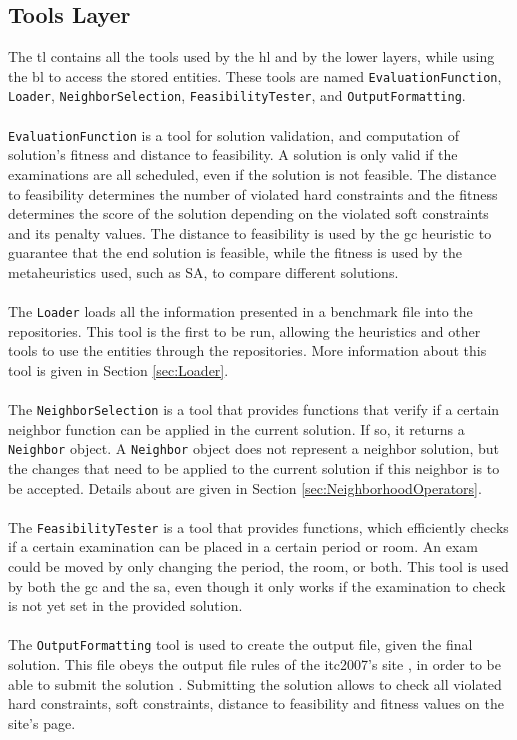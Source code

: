 \subsection{Tools Layer}
\label{subsec:ToolsLayer}
The \gls{tl} contains all the tools used by the \gls{hl} and by the lower layers, while using the \gls{bl} to access the stored entities. These tools are named \verb+EvaluationFunction+, \verb+Loader+, \verb+NeighborSelection+, \verb+FeasibilityTester+, and \verb+OutputFormatting+.\\
\\
\verb+EvaluationFunction+ is a tool  for solution validation, and computation of solution's fitness and distance to feasibility. A solution is only valid if the examinations are all scheduled, even if the solution is not feasible. The distance to feasibility determines the number of violated hard constraints and the fitness determines the score of the solution depending on the violated soft constraints and its penalty values. The distance to feasibility is used by the \gls{gc} heuristic to guarantee that the end solution is feasible, while the fitness is used by the metaheuristics used, such as SA, to compare different solutions.\\
\\
The \verb+Loader+ loads all the information presented in a benchmark file into the repositories. This tool is the first to be run, allowing the heuristics and other tools to use the entities through the repositories. More information about this tool is given in Section \ref{sec:Loader}.\\
\\
The \verb+NeighborSelection+ is a tool that provides functions that verify if a certain neighbor function can be applied in the current solution. If so, it returns a \verb+Neighbor+ object. A \verb+Neighbor+ object does not represent a neighbor solution, but the changes that need to be applied to the current solution if this neighbor is to be accepted. Details about are given in Section \ref{sec:NeighborhoodOperators}.\\
\\
The \verb+FeasibilityTester+ is a tool that provides functions, which efficiently checks if a certain examination can be placed in a certain period or room. An exam could be moved by only changing the period, the room, or both. This tool is used by both the \gls{gc} and the \gls{sa}, even though it only works if the examination to check is not yet set in the provided solution.\\
\\
The \verb+OutputFormatting+ tool is used to create the output file, given the final solution. This file obeys the output file rules of the \gls{itc2007}'s site \cite{McCollum2007b}, in order to be able to submit the solution \cite{McCollum2007c}. Submitting the solution allows to check all violated hard constraints, soft constraints, distance to feasibility and fitness values on the site's page.

